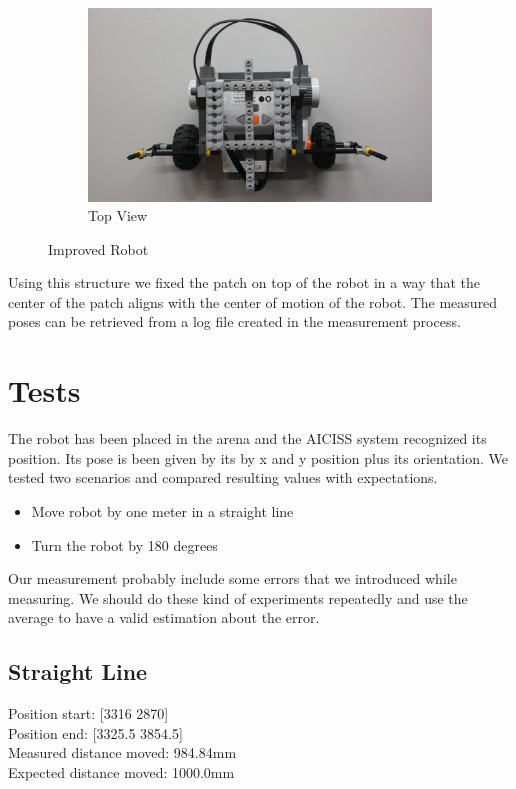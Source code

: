 \documentclass[paper=a4, fontsize=11pt]{scrartcl} %
\numberwithin{equation}{section} %
\numberwithin{figure}{section} %
\numberwithin{table}{section} %
\begin{document}
\begin{figure}[H]
    \begin{subfigure}[b]{0.3\textwidth}
        \includegraphics[width=\textwidth]{top.jpg}
        \caption{Top View}
        \label{fig:top}
    \end{subfigure}
    \caption{Improved Robot}\label{fig:robot}
\end{figure}

Using this structure we fixed the patch on top of the robot in a way that the center of the patch aligns with the center of motion of the robot.
The measured poses can be retrieved from a log file created in the measurement process.


\section{Tests}
The robot has been placed in the arena and the AICISS system recognized its position.
Its pose is been given by its by x and y position plus its orientation.
We tested two scenarios and compared resulting values with expectations.
\begin{itemize}
	\item Move robot by one meter in a straight line
	\item Turn the robot by 180 degrees
\end{itemize}
Our measurement probably include some errors that we introduced while measuring. 
We should do these kind of experiments repeatedly and use the average to have a valid estimation about the error.

\subsection{Straight Line}
Position start: [3316 2870]\\
Position end: [3325.5 3854.5]\\
Measured distance moved: 984.84mm\\
Expected distance moved: 1000.0mm
\end{document}
